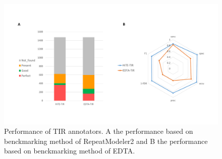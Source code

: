 \documentclass{bmcart}
\begin{document}
\begin{figure}[h!]
	\centerline{\includegraphics[width=1.0\textwidth]{figures/TIRResults.pdf}}
	\caption{Performance of TIR annotators. A the performance based on benckmarking method of RepeatModeler2 and B the performance based on benckmarking method of EDTA.}
	\label{fig:tir_results}
\end{figure}
\end{document}
